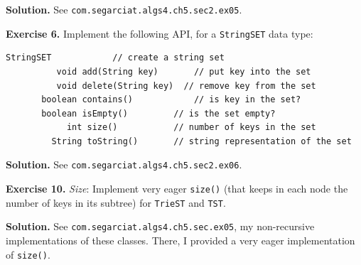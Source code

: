 \documentclass[12pt, a4paper]{article}
\newenvironment{ex}[2][Exercise]
{\par\medskip\noindent \textbf{#1 #2.}}
{\medskip}
\newenvironment{sol}[1][Solution]
{\par\medskip\noindent \textbf{#1.} }
{\medskip}
\begin{document}
	\begin{sol}
		See \texttt{com.segarciat.algs4.ch5.sec2.ex05}.
	\end{sol}
	\begin{ex}{6}
		Implement the following API, for a \texttt{StringSET} data type:
		\begin{lstlisting}[language={}]
                StringSET            // create a string set
          void add(String key)       // put key into the set
          void delete(String key)  // remove key from the set
       boolean contains()            // is key in the set?
       boolean isEmpty()         // is the set empty?
            int size()           // number of keys in the set
         String toString()       // string representation of the set
		\end{lstlisting}
	\end{ex}
	\begin{sol}
		See \texttt{com.segarciat.algs4.ch5.sec2.ex06}.
	\end{sol}
	\begin{ex}{10}
		\emph{Size}: Implement very eager \texttt{size()} (that keeps in each node the
		number of keys in its subtree) for \texttt{TrieST} and \texttt{TST}.
	\end{ex}
	\begin{sol}
		See \texttt{com.segarciat.algs4.ch5.sec.ex05}, my non-recursive implementations
		of these classes. There, I provided a very eager implementation of \texttt{size()}.
	\end{sol}
	\pagebreak
	\printbibliography
\end{document}

